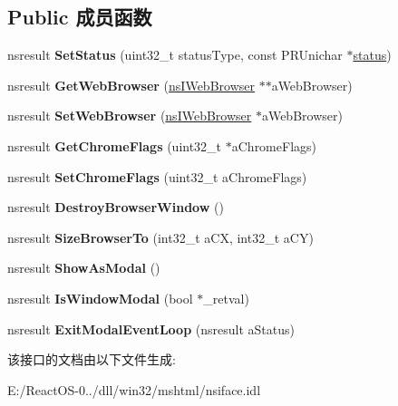 \subsection*{Public 成员函数}
\begin{DoxyCompactItemize}
\item 
\mbox{\label{interfacens_i_web_browser_chrome_a134bdc51199fe7c5062a0860c0339127}} 
nsresult {\bfseries Set\+Status} (uint32\+\_\+t status\+Type, const P\+R\+Unichar $\ast$\hyperlink{structstatus}{status})
\item 
\mbox{\label{interfacens_i_web_browser_chrome_ae17cf013577a5fb69b6ffbf4d0a9692c}} 
nsresult {\bfseries Get\+Web\+Browser} (\hyperlink{interfacens_i_web_browser}{ns\+I\+Web\+Browser} $\ast$$\ast$a\+Web\+Browser)
\item 
\mbox{\label{interfacens_i_web_browser_chrome_ac82d3a29ce0371eb6d4220a594f1a4f9}} 
nsresult {\bfseries Set\+Web\+Browser} (\hyperlink{interfacens_i_web_browser}{ns\+I\+Web\+Browser} $\ast$a\+Web\+Browser)
\item 
\mbox{\label{interfacens_i_web_browser_chrome_a5a89b3d197e3d6b7e70cabb88081c3d4}} 
nsresult {\bfseries Get\+Chrome\+Flags} (uint32\+\_\+t $\ast$a\+Chrome\+Flags)
\item 
\mbox{\label{interfacens_i_web_browser_chrome_a9515596c88d1e7d13787f5be0c672c5e}} 
nsresult {\bfseries Set\+Chrome\+Flags} (uint32\+\_\+t a\+Chrome\+Flags)
\item 
\mbox{\label{interfacens_i_web_browser_chrome_addd85676f70b254c85fe6b5d83cacc0e}} 
nsresult {\bfseries Destroy\+Browser\+Window} ()
\item 
\mbox{\label{interfacens_i_web_browser_chrome_a199655934f185a0567daca7ffc36d3ef}} 
nsresult {\bfseries Size\+Browser\+To} (int32\+\_\+t a\+CX, int32\+\_\+t a\+CY)
\item 
\mbox{\label{interfacens_i_web_browser_chrome_a2ae9e4e7cfd6d177ab548700fb456aec}} 
nsresult {\bfseries Show\+As\+Modal} ()
\item 
\mbox{\label{interfacens_i_web_browser_chrome_a6e47c3db05ac14b9543525cfd4a94541}} 
nsresult {\bfseries Is\+Window\+Modal} (bool $\ast$\+\_\+retval)
\item 
\mbox{\label{interfacens_i_web_browser_chrome_a1429a5247e951b3899d4c2b61091f86c}} 
nsresult {\bfseries Exit\+Modal\+Event\+Loop} (nsresult a\+Status)
\end{DoxyCompactItemize}


该接口的文档由以下文件生成\+:\begin{DoxyCompactItemize}
\item 
E\+:/\+React\+O\+S-\/0../dll/win32/mshtml/nsiface.\+idl\end{DoxyCompactItemize}
